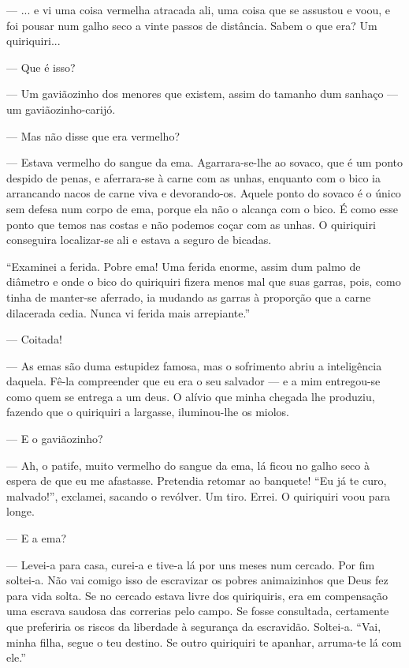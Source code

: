 --- ... e vi uma coisa vermelha atracada ali, uma coisa que se assustou
e voou, e foi pousar num galho seco a vinte passos de distância. Sabem o
que era? Um quiriquiri...

--- Que é isso?

--- Um gaviãozinho dos menores que existem, assim do tamanho dum sanhaço
--- um gaviãozinho-carijó.

--- Mas não disse que era vermelho?

--- Estava vermelho do sangue da ema. Agarrara-se-lhe ao sovaco, que é
um ponto despido de penas, e aferrara-se à carne com as unhas, enquanto
com o bico ia arrancando nacos de carne viva e devorando-os. Aquele
ponto do sovaco é o único sem defesa num corpo de ema, porque ela não o
alcança com o bico. É como esse ponto que temos nas costas e não podemos
coçar com as unhas. O quiriquiri conseguira localizar-se ali e estava a
seguro de bicadas.

``Examinei a ferida. Pobre ema! Uma ferida enorme, assim dum palmo de
diâmetro e onde o bico do quiriquiri fizera menos mal que suas garras,
pois, como tinha de manter-se aferrado, ia mudando as garras à proporção
que a carne dilacerada cedia. Nunca vi ferida mais arrepiante.''

--- Coitada!

--- As emas são duma estupidez famosa, mas o sofrimento abriu a
inteligência daquela. Fê-la compreender que eu era o seu salvador --- e
a mim entregou-se como quem se entrega a um deus. O alívio que minha
chegada lhe produziu, fazendo que o quiriquiri a largasse, iluminou-lhe
os miolos.

--- E o gaviãozinho?

--- Ah, o patife, muito vermelho do sangue da ema, lá ficou no galho
seco à espera de que eu me afastasse. Pretendia retomar ao banquete!
``Eu já te curo, malvado!'', exclamei, sacando o revólver. Um tiro.
Errei. O quiriquiri voou para longe.

--- E a ema?

--- Levei-a para casa, curei-a e tive-a lá por uns meses num cercado.
Por fim soltei-a. Não vai comigo isso de escravizar os pobres
animaizinhos que Deus fez para vida solta. Se no cercado estava livre
dos quiriquiris, era em compensação uma escrava saudosa das correrias
pelo campo. Se fosse consultada, certamente que preferiria os riscos da
liberdade à segurança da escravidão. Soltei-a. ``Vai, minha filha, segue
o teu destino. Se outro quiriquiri te apanhar, arruma-te lá com ele.''

